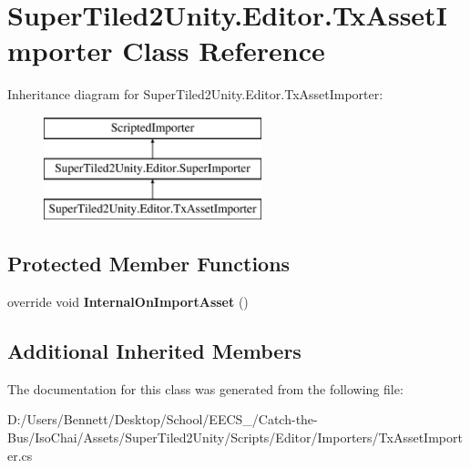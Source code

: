\hypertarget{class_super_tiled2_unity_1_1_editor_1_1_tx_asset_importer}{}\section{Super\+Tiled2\+Unity.\+Editor.\+Tx\+Asset\+Importer Class Reference}
\label{class_super_tiled2_unity_1_1_editor_1_1_tx_asset_importer}
Inheritance diagram for Super\+Tiled2\+Unity.\+Editor.\+Tx\+Asset\+Importer\+:\begin{figure}[H]
\begin{center}
\leavevmode
\includegraphics[height=3.000000cm]{class_super_tiled2_unity_1_1_editor_1_1_tx_asset_importer}
\end{center}
\end{figure}
\subsection*{Protected Member Functions}
\begin{DoxyCompactItemize}
\item 
\mbox{\label{class_super_tiled2_unity_1_1_editor_1_1_tx_asset_importer_a4d67075694f12306687078f1b5f90eb6}} 
override void {\bfseries Internal\+On\+Import\+Asset} ()
\end{DoxyCompactItemize}
\subsection*{Additional Inherited Members}


The documentation for this class was generated from the following file\+:\begin{DoxyCompactItemize}
\item 
D\+:/\+Users/\+Bennett/\+Desktop/\+School/\+E\+E\+C\+S\+\_/\+Catch-\/the-\/\+Bus/\+Iso\+Chai/\+Assets/\+Super\+Tiled2\+Unity/\+Scripts/\+Editor/\+Importers/Tx\+Asset\+Importer.\+cs\end{DoxyCompactItemize}
